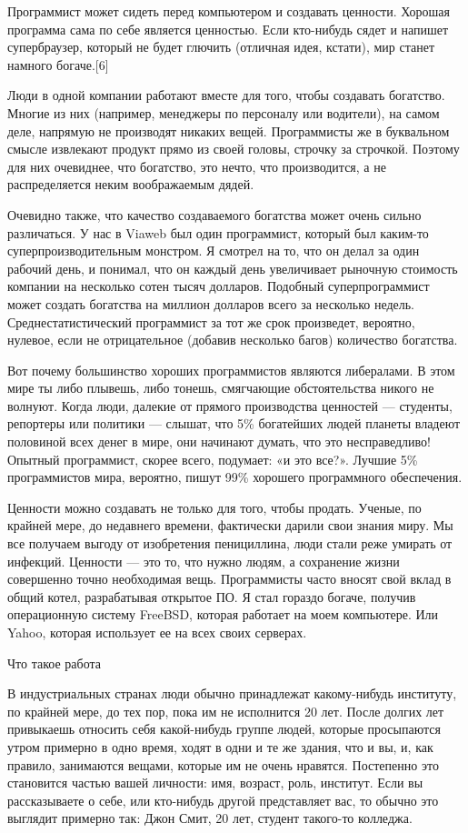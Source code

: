 \documentclass[ebook,12pt,oneside,openany]{memoir}
\begin{document}
Программист может сидеть перед компьютером и создавать ценности.
Хорошая программа сама по себе является ценностью. Если кто-нибудь
сядет и напишет супербраузер, который не будет глючить (отличная идея,
кстати), мир станет намного богаче.[6]

Люди в одной компании работают вместе для того, чтобы создавать
богатство. Многие из них (например, менеджеры по персоналу или
водители), на самом деле, напрямую не производят никаких вещей.
Программисты же в буквальном смысле извлекают продукт прямо из своей
головы, строчку за строчкой. Поэтому для них очевиднее, что богатство,
это нечто, что производится, а не распределяется неким воображаемым
дядей.

Очевидно также, что качество создаваемого богатства может очень сильно
различаться. У нас в Viaweb был один программист, который был каким-то
суперпроизводительным монстром. Я смотрел на то, что он делал за один
рабочий день, и понимал, что он каждый день увеличивает рыночную
стоимость компании на несколько сотен тысяч долларов. Подобный
суперпрограммист может создать богатства на миллион долларов всего за
несколько недель. Среднестатистический программист за тот же срок
произведет, вероятно, нулевое, если не отрицательное (добавив
несколько багов) количество богатства.

Вот почему большинство хороших программистов являются либералами. В
этом мире ты либо плывешь, либо тонешь, смягчающие обстоятельства
никого не волнуют. Когда люди, далекие от прямого производства
ценностей — студенты, репортеры или политики — слышат, что 5\%
богатейших людей планеты владеют половиной всех денег в мире, они
начинают думать, что это несправедливо! Опытный программист, скорее
всего, подумает: «и это все?». Лучшие 5\% программистов мира,
вероятно, пишут 99\% хорошего программного обеспечения.

Ценности можно создавать не только для того, чтобы продать. Ученые, по
крайней мере, до недавнего времени, фактически дарили свои знания
миру. Мы все получаем выгоду от изобретения пенициллина, люди стали
реже умирать от инфекций. Ценности — это то, что нужно людям, а
сохранение жизни совершенно точно необходимая вещь. Программисты часто
вносят свой вклад в общий котел, разрабатывая открытое ПО. Я стал
гораздо богаче, получив операционную систему FreeBSD, которая работает
на моем компьютере. Или Yahoo, которая использует ее на всех своих
серверах.

Что такое работа

В индустриальных странах люди обычно принадлежат какому-нибудь
институту, по крайней мере, до тех пор, пока им не исполнится 20 лет.
После долгих лет привыкаешь относить себя какой-нибудь группе людей,
которые просыпаются утром примерно в одно время, ходят в одни и те же
здания, что и вы, и, как правило, занимаются вещами, которые им не
очень нравятся. Постепенно это становится частью вашей личности: имя,
возраст, роль, институт. Если вы рассказываете о себе, или кто-нибудь
другой представляет вас, то обычно это выглядит примерно так: Джон
Смит, 20 лет, студент такого-то колледжа.
\end{document}
